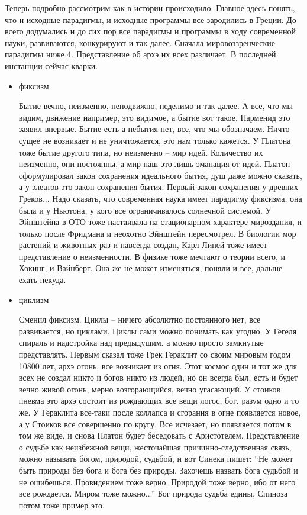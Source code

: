 \documentclass[a4paper, 12pt]{article}
\begin{document}
Теперь подробно рассмотрим как в истории происходило. Главное здесь 
понять, что и исходные парадигмы, и исходные программы все зародились 
в Греции. До всего додумались и до сих пор все парадигмы и программы 
в ходу современной науки, развиваются, конкурируют и так далее. Сначала 
мировоззренческие парадигмы ниже 4. Представление об архэ их всех 
различает. В последней инстанции сейчас кварки.
\begin{itemize}
  \item фиксизм

    Бытие вечно, неизменно, неподвижно, неделимо и так далее. А все, что 
    мы видим, движение например, это видимое, а бытие вот такое. 
    Парменид это заявил впервые. Бытие есть а небытия нет, все, что мы 
    обозначаем. Ничто сущее не возникает и не уничтожается, это нам 
    только кажется. У Платона тоже бытие другого типа, но неизменно -- 
    мир идей. Количество их неизменно, они постоянны, а мир наш это лишь 
    эманация от идей. Платон сформулировал закон сохранения идеального 
    бытия, душ даже можно сказать, а у элеатов это закон сохранения 
    бытия. Первый закон сохранения у древних Греков... Надо сказать, что 
    современная наука имеет парадигму фиксизма, она была и у Ньютона, 
    у кого все ограничивалось солнечной системой. У Эйнштейна в ОТО тоже 
    настаивала на стационарном характере мироздания, и только после 
    Фридмана и неохотно Эйнштейн пересмотрел. В биологии мор растений 
    и животных раз и навсегда создан, Карл Линей тоже имеет 
    представление о неизменности. В физике тоже мечтают о теории всего, 
    и Хокинг, и Вайнберг. Она же не может изменяться, поняли и все, 
    дальше ехать некуда.

  \item циклизм

    Сменил фиксизм. Циклы -- ничего абсолютно постоянного нет, все 
    развивается, но циклами. Циклы сами можно понимать как угодно. 
    У Гегеля спираль и надстройка над предыдущим. а можно просто 
    замкнутые представлять. Первым сказал тоже Грек Гераклит со своим 
    мировым годом 10800 лет, архэ огонь, все возникает из огня. Этот 
    космос один и тот же для всех не создал никто и богов никто из 
    людей, но он всегда был, есть и будет вечно живой огонь, мерно 
    возгорающийся, вечно угасающий. У стоиков пневма это архэ состоит из 
    рождающих все вещи логос, бог, разум одно и то же. У Гераклита 
    все-таки после коллапса и сгорания в огне появляется новое, 
    а у Стоиков все совершенно по кругу. Все исчезает, но появляется 
    потом в том же виде, и снова Платон будет беседовать с Аристотелем. 
    Представление о судьбе как неизбежной вещи, жесточайшая 
    причинно-следственная связь, можно называть богом, природой, 
    судьбой, и вот Синека пишет: ``Не может быть природы без бога и бога 
    без природы. Захочешь назвать бога судьбой и не ошибешься. 
    Провидением тоже верно. Природой тоже верно, ибо от него все 
    рождается. Миром тоже можно...'' Бог природа судьба едины, Спиноза 
    потом тоже пример это.


\end{itemize}
\end{document}
